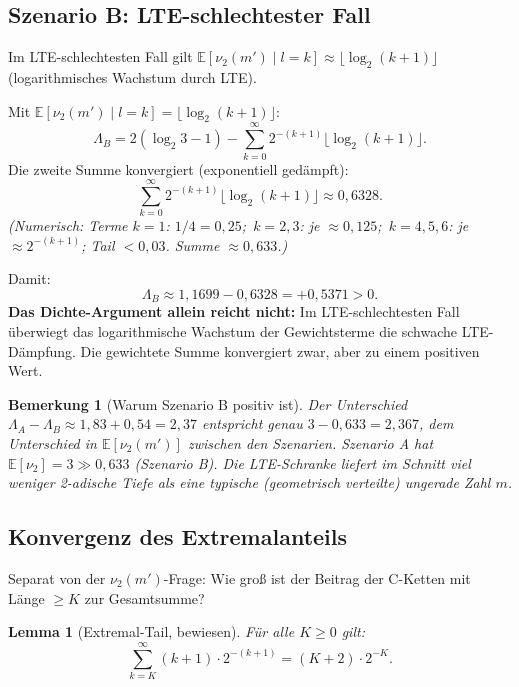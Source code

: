 \documentclass[12pt,a4paper]{article}
\newtheorem{lemma}[definition]{Lemma}
\newtheorem{bemerkung}[definition]{Bemerkung}
\newcommand{\vii}{\nu_2}
\begin{document}
\subsection{Szenario B: LTE-schlechtester Fall}

Im LTE-schlechtesten Fall gilt $\mathbb{E}[\vii(m') \mid l=k] \approx \lfloor\log_2(k+1)\rfloor$
(logarithmisches Wachstum durch LTE).

\begin{tcolorbox}[negativ, title={Szenario B: $\Lambda_B > 0$ (berechnet)}]
Mit $\mathbb{E}[\vii(m') \mid l=k] = \lfloor\log_2(k+1)\rfloor$:
\[
  \Lambda_B = 2(\log_2 3 - 1) - \sum_{k=0}^{\infty} 2^{-(k+1)}\lfloor\log_2(k+1)\rfloor.
\]
Die zweite Summe konvergiert (exponentiell gedämpft):
\[
  \sum_{k=0}^{\infty} 2^{-(k+1)}\lfloor\log_2(k+1)\rfloor \approx 0{,}6328.
\]
\textit{(Numerisch: Terme $k=1$: $1/4=0{,}25$;\ $k=2,3$: je $\approx 0{,}125$;\ 
$k=4,5,6$: je $\approx 2^{-(k+1)}$; Tail $< 0{,}03$. Summe $\approx 0{,}633$.)}

Damit:
\[
  \boxed{\Lambda_B \approx 1{,}1699 - 0{,}6328 = +0{,}5371 > 0.}
\]
\textbf{Das Dichte-Argument allein reicht nicht:} Im LTE-schlechtesten
Fall überwiegt das logarithmische Wachstum der Gewichtsterme die
schwache LTE-Dämpfung. Die gewichtete Summe konvergiert zwar, aber
zu einem positiven Wert.
\end{tcolorbox}

\begin{bemerkung}[Warum Szenario B positiv ist]
Der Unterschied $\Lambda_A - \Lambda_B \approx 1{,}83 + 0{,}54 = 2{,}37$ entspricht
genau $3 - 0{,}633 = 2{,}367$, dem Unterschied in $\mathbb{E}[\vii(m')]$ zwischen
den Szenarien. Szenario A hat $\mathbb{E}[\vii] = 3 \gg 0{,}633$ (Szenario B).
Die LTE-Schranke liefert im Schnitt viel weniger 2-adische Tiefe als
eine typische (geometrisch verteilte) ungerade Zahl $m$.
\end{bemerkung}

\subsection{Konvergenz des Extremalanteils}

Separat von der $\vii(m')$-Frage: Wie groß ist der
Beitrag der C-Ketten mit Länge $\geq K$ zur Gesamtsumme?

\begin{lemma}[Extremal-Tail, bewiesen]
\label{lem:tail}
Für alle $K \geq 0$ gilt:
\[
  \sum_{k=K}^{\infty}(k+1)\cdot 2^{-(k+1)}
  = (K+2)\cdot 2^{-K}.
\]
\end{lemma}
\end{document}
